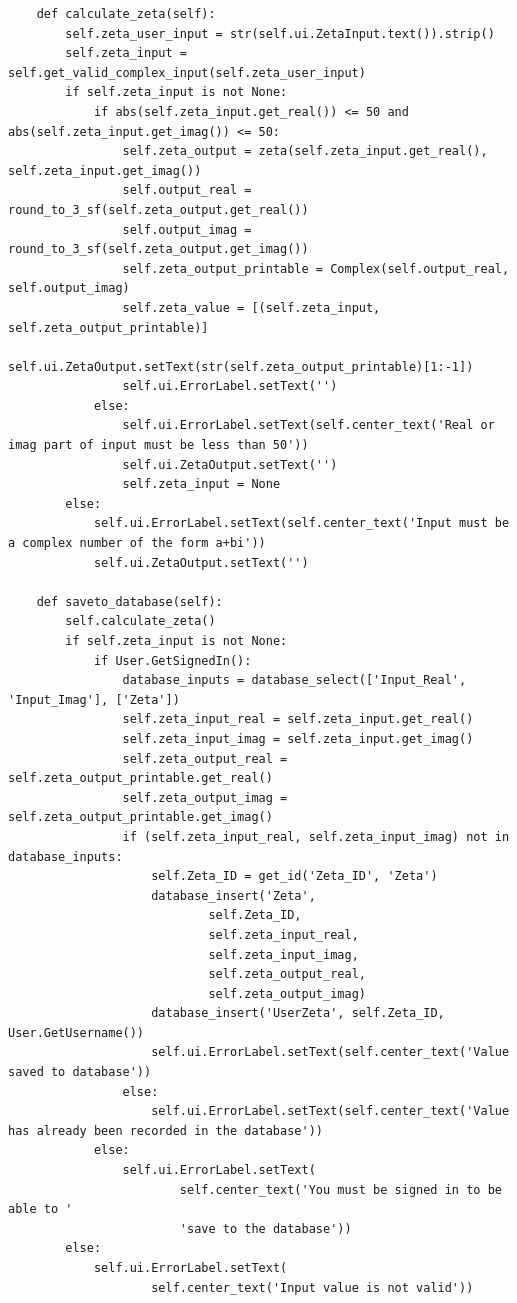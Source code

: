 \documentclass[12pt]{article}
\begin{document}
\begin{lstlisting}
    def calculate_zeta(self):
        self.zeta_user_input = str(self.ui.ZetaInput.text()).strip()
        self.zeta_input = self.get_valid_complex_input(self.zeta_user_input)
        if self.zeta_input is not None:
            if abs(self.zeta_input.get_real()) <= 50 and abs(self.zeta_input.get_imag()) <= 50:
                self.zeta_output = zeta(self.zeta_input.get_real(), self.zeta_input.get_imag())
                self.output_real = round_to_3_sf(self.zeta_output.get_real())
                self.output_imag = round_to_3_sf(self.zeta_output.get_imag())
                self.zeta_output_printable = Complex(self.output_real, self.output_imag)
                self.zeta_value = [(self.zeta_input, self.zeta_output_printable)]
                self.ui.ZetaOutput.setText(str(self.zeta_output_printable)[1:-1])
                self.ui.ErrorLabel.setText('')
            else:
                self.ui.ErrorLabel.setText(self.center_text('Real or imag part of input must be less than 50'))
                self.ui.ZetaOutput.setText('')
                self.zeta_input = None
        else:
            self.ui.ErrorLabel.setText(self.center_text('Input must be a complex number of the form a+bi'))
            self.ui.ZetaOutput.setText('')

    def saveto_database(self):
        self.calculate_zeta()
        if self.zeta_input is not None:
            if User.GetSignedIn():
                database_inputs = database_select(['Input_Real', 'Input_Imag'], ['Zeta'])
                self.zeta_input_real = self.zeta_input.get_real()
                self.zeta_input_imag = self.zeta_input.get_imag()
                self.zeta_output_real = self.zeta_output_printable.get_real()
                self.zeta_output_imag = self.zeta_output_printable.get_imag()
                if (self.zeta_input_real, self.zeta_input_imag) not in database_inputs:
                    self.Zeta_ID = get_id('Zeta_ID', 'Zeta')
                    database_insert('Zeta',
                            self.Zeta_ID,
                            self.zeta_input_real,
                            self.zeta_input_imag,
                            self.zeta_output_real,
                            self.zeta_output_imag)
                    database_insert('UserZeta', self.Zeta_ID, User.GetUsername())
                    self.ui.ErrorLabel.setText(self.center_text('Value saved to database'))
                else:
                    self.ui.ErrorLabel.setText(self.center_text('Value has already been recorded in the database'))
            else:
                self.ui.ErrorLabel.setText(
                        self.center_text('You must be signed in to be able to '
                        'save to the database'))
        else:
            self.ui.ErrorLabel.setText(
                    self.center_text('Input value is not valid'))


\end{lstlisting}
\end{document}
